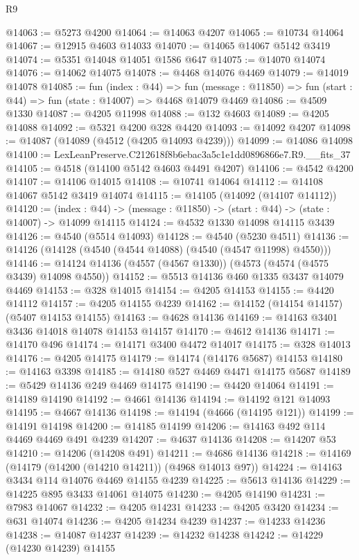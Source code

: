 \begin{lexlean}{R9}
\begin{coremodule}
@14063 := @5273 @4200
@14064 := @14063 @4207
@14065 := @10734 @14064
@14067 := @12915 @4603 @14033
@14070 := @14065 @14067 @5142 @3419
@14074 := @5351 @14048 @14051 @1586 @647
@14075 := @14070 @14074
@14076 := @14062 @14075
@14078 := @4468 @14076 @4469
@14079 := @14019 @14078
@14085 := fun (index : @44) =>
  fun (message : @11850) => fun (start : @44) => fun (state : @14007) => @4468 @14079 @4469
@14086 := @4509 @1330
@14087 := @4205 @11998
@14088 := @132 @4603
@14089 := @4205 @14088
@14092 := @5321 @4200 @328 @4420
@14093 := @14092 @4207
@14098 := @14087 (@14089 (@4512 (@4205 @14093 @4239)))
@14099 := @14086 @14098
@14100 := LexLeanPreserve.C212618f8b6ebac3a5c1e1dd0896866e7.R9.__fits_37
@14105 := @4518 (@14100 @5142 @4603 @4491 @4207)
@14106 := @4542 @4200
@14107 := @14106 @14015
@14108 := @10741 @14064
@14112 := @14108 @14067 @5142 @3419 @14074
@14115 := @14105 (@14092 (@14107 @14112))
@14120 := (index : @44) -> (message : @11850) -> (start : @44) -> (state : @14007) -> @14099 @14115
@14124 := @4532 @1330 @14098 @14115 @3439
@14126 := @4540 (@5514 @14093)
@14128 := @4540 (@5230 @4511)
@14136 := @14126 (@14128 (@4540 (@4544 @14088) (@4540 (@4547 @11998) @4550)))
@14146 := @14124 @14136 (@4557 (@4567 @1330)) (@4573 (@4574 (@4575 @3439) @14098 @4550))
@14152 := @5513 @14136 @460 @1335 @3437 @14079 @4469
@14153 := @328 @14015
@14154 := @4205 @14153
@14155 := @4420 @14112
@14157 := @4205 @14155 @4239
@14162 := @14152 (@14154 @14157) (@5407 @14153 @14155)
@14163 := @4628 @14136
@14169 := @14163 @3401 @3436 @14018 @14078 @14153 @14157
@14170 := @4612 @14136
@14171 := @14170 @496
@14174 := @14171 @3400 @4472 @14017
@14175 := @328 @14013
@14176 := @4205 @14175
@14179 := @14174 (@14176 @5687) @14153
@14180 := @14163 @3398
@14185 := @14180 @527 @4469 @4471 @14175 @5687
@14189 := @5429 @14136 @249 @4469 @14175
@14190 := @4420 @14064
@14191 := @14189 @14190
@14192 := @4661 @14136
@14194 := @14192 @121 @14093
@14195 := @4667 @14136
@14198 := @14194 (@4666 (@14195 @121))
@14199 := @14191 @14198
@14200 := @14185 @14199
@14206 := @14163 @492 @114 @4469 @4469 @491 @4239
@14207 := @4637 @14136
@14208 := @14207 @53
@14210 := @14206 (@14208 @491)
@14211 := @4686 @14136
@14218 := @14169 (@14179 (@14200 (@14210 @14211)) (@4968 @14013 @97))
@14224 := @14163 @3434 @114 @14076 @4469 @14155 @4239
@14225 := @5613 @14136
@14229 := @14225 @895 @3433 @14061 @14075
@14230 := @4205 @14190
@14231 := @7983 @14067
@14232 := @4205 @14231
@14233 := @4205 @3420
@14234 := @631 @14074
@14236 := @4205 @14234 @4239
@14237 := @14233 @14236
@14238 := @14087 @14237
@14239 := @14232 @14238
@14242 := @14229 (@14230 @14239) @14155

\end{coremodule}
\end{lexlean}
